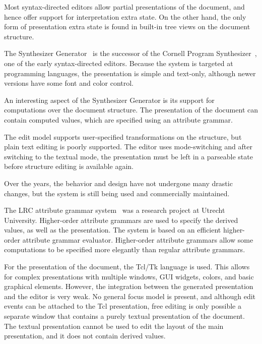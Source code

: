 Most syntax-directed editors allow partial presentations of the document, and hence offer support for interpretation extra state. On the other hand, the only form of presentation extra state is found in built-in tree views on the document structure.


The Synthesizer Generator~\cite{reps84synGen} is the successor of the Cornell Program Synthesizer~\cite{teitelbaum81progSynth}, one of the early syntax-directed editors. Because the system is targeted at programming languages, the presentation is simple and text-only, although newer versions have some font and color control. 


An interesting aspect of the Synthesizer Generator is its support for computations over the document structure. The presentation of the document can contain computed values, which are specified using an attribute grammar. 

The edit model supports user-specified transformations on the structure, but plain text editing is poorly supported. The editor uses mode-switching and after switching to the textual mode, the presentation must be left in a parseable state before structure editing is available again.

Over the years, the behavior and design have not undergone many drastic changes, but the system is still being used and commercially maintained.


The LRC attribute grammar system~\cite{saraiva00lrc} was a research project at Utrecht University. Higher-order attribute grammars are used to specify the derived values, as well as the presentation. The system is based on an efficient higher-order attribute grammar evaluator. Higher-order attribute grammars allow some computations to be specified more elegantly than regular attribute grammars.

For the presentation of the document, the Tcl/Tk language is used. This allows for complex presentations with multiple windows, GUI widgets, colors, and basic graphical elements. However, the integration between the generated presentation and the editor is very weak. No general focus model is present, and although edit events can be attached to the Tcl presentation, free editing is only possible a separate window that contains a purely textual presentation of the document. The textual presentation cannot be used to edit the layout of the main presentation, and it does not contain derived values. 

